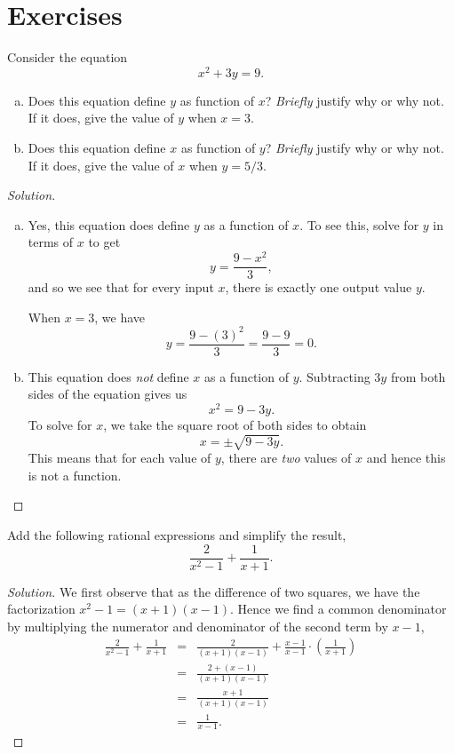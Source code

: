 \documentclass[12pt]{amsart}
\begin{document}
\section{Exercises}
\begin{thm}[20 Points]\label{ex7}
  Consider the equation
  $$x^2 + 3y = 9.$$
  \begin{enumerate}[(a)]
    \item
      Does this equation define $y$ as function of $x$?  
      {\it Briefly} justify why or why not.
      If it does, give the value of $y$ when $x = 3$.
    \item
      Does this equation define $x$ as function of $y$?  {\it Briefly} justify why or why not.
      If it does, give the value of $x$ when $y = 5/3$.
  \end{enumerate}
  
  \begin{proof}[Solution]
    \begin{enumerate}[(a)]
    \item
      Yes, this equation does define $y$ as a function of $x$.
      To see this, solve for $y$ in terms of $x$ to get
      $$y = \frac{9 - x^2}{3},$$
      and so we see that for every input $x$, there is exactly one output value $y$.

      When $x = 3$, we have 
      $$y = \frac{9 - (3)^2}{3} = \frac{9 - 9}{3} = 0.$$
    \item
      This equation does {\it not} define $x$ as a function of $y$.
      Subtracting $3y$ from both sides of the equation gives us
      $$x^2 = 9 - 3y.$$
      To solve for $x$, we take the square root of both sides to obtain
      $$x = \pm\sqrt{9 - 3y}.$$
      This means that for each value of $y$, there are {\it two} values of $x$ and hence this is not a function.
    \end{enumerate}
  \end{proof}
\end{thm}

\begin{thm}[20 Points]\label{ex8}
  Add the following rational expressions and simplify the result,
  $$\frac{2}{x^2 - 1} + \frac{1}{x+1}.$$
  
  \begin{proof}[Solution]
    We first observe that as the difference of two squares, we have the factorization $x^2 - 1 = (x + 1)(x -1)$.
    Hence we find a common denominator by multiplying the numerator and denominator of the second term by $x - 1$,
    \begin{eqnarray*}
      \frac{2}{x^2 - 1} + \frac{1}{x+1} &=& \frac{2}{(x + 1)(x - 1)} + \frac{x - 1}{x - 1} \cdot \left(\frac{1}{x+1}\right)\\
      &=& \frac{2 + (x - 1)}{(x+1)(x-1)}\\
      &=& \frac{x + 1}{(x + 1)(x - 1)}\\
      &=& \frac{1}{x - 1}.      
    \end{eqnarray*}
  \end{proof}
\end{thm}
\end{document}

